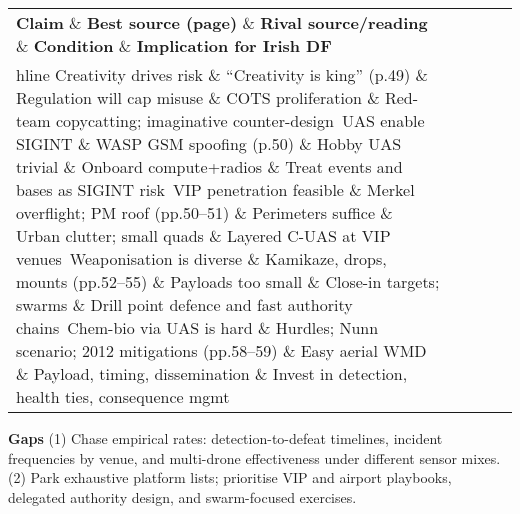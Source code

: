  
\begin{tabular}{p{3.2cm}p{4.2cm}p{3.6cm}p{3.2cm}p{4.2cm}}
	\textbf{Claim} \& \textbf{Best source (page)} \& \textbf{Rival source/reading} \& \textbf{Condition} \& \textbf{Implication for Irish DF}\\hline
	Creativity drives risk \& “Creativity is king” (p.49) \& Regulation will cap misuse \& COTS proliferation \& Red-team copycatting; imaginative counter-design\
	UAS enable SIGINT \& WASP GSM spoofing (p.50) \& Hobby UAS trivial \& Onboard compute+radios \& Treat events and bases as SIGINT risk\
	VIP penetration feasible \& Merkel overflight; PM roof (pp.50–51) \& Perimeters suffice \& Urban clutter; small quads \& Layered C-UAS at VIP venues\
	Weaponisation is diverse \& Kamikaze, drops, mounts (pp.52–55) \& Payloads too small \& Close-in targets; swarms \& Drill point defence and fast authority chains\
	Chem-bio via UAS is hard \& Hurdles; Nunn scenario; 2012 mitigations (pp.58–59) \& Easy aerial WMD \& Payload, timing, dissemination \& Invest in detection, health ties, consequence mgmt\
\end{tabular}

\textbf{Gaps}
(1) Chase empirical rates: detection-to-defeat timelines, incident frequencies by venue, and multi-drone effectiveness under different sensor mixes.
(2) Park exhaustive platform lists; prioritise VIP and airport playbooks, delegated authority design, and swarm-focused exercises.

\parencite{SCHAUS_2018
}

